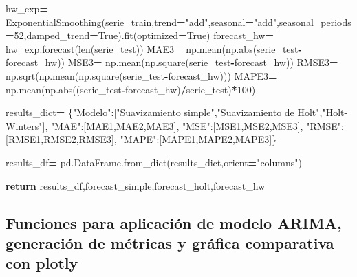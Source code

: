 \documentclass[
]{book}
\newenvironment{Shaded}{\begin{snugshade}}{\end{snugshade}}
\newcommand{\BuiltInTok}[1]{#1}
\newcommand{\ControlFlowTok}[1]{\textcolor[rgb]{0.13,0.29,0.53}{\textbf{#1}}}
\newcommand{\DecValTok}[1]{\textcolor[rgb]{0.00,0.00,0.81}{#1}}
\newcommand{\NormalTok}[1]{#1}
\newcommand{\OperatorTok}[1]{\textcolor[rgb]{0.81,0.36,0.00}{\textbf{#1}}}
\newcommand{\StringTok}[1]{\textcolor[rgb]{0.31,0.60,0.02}{#1}}
\newcommand{\VariableTok}[1]{\textcolor[rgb]{0.00,0.00,0.00}{#1}}
\begin{document}
\begin{Shaded}
\begin{Highlighting}[]
\NormalTok{    hw\_exp}\OperatorTok{=}\NormalTok{ ExponentialSmoothing(serie\_train,trend}\OperatorTok{=}\StringTok{"add"}\NormalTok{,seasonal}\OperatorTok{=}\StringTok{"add"}\NormalTok{,seasonal\_periods}\OperatorTok{=}\DecValTok{52}\NormalTok{,damped\_trend}\OperatorTok{=}\VariableTok{True}\NormalTok{).fit(optimized}\OperatorTok{=}\VariableTok{True}\NormalTok{)}
\NormalTok{    forecast\_hw}\OperatorTok{=}\NormalTok{ hw\_exp.forecast(}\BuiltInTok{len}\NormalTok{(serie\_test))}
\NormalTok{    MAE3}\OperatorTok{=}\NormalTok{ np.mean(np.}\BuiltInTok{abs}\NormalTok{(serie\_test}\OperatorTok{{-}}\NormalTok{forecast\_hw))}
\NormalTok{    MSE3}\OperatorTok{=}\NormalTok{ np.mean(np.square(serie\_test}\OperatorTok{{-}}\NormalTok{forecast\_hw))}
\NormalTok{    RMSE3}\OperatorTok{=}\NormalTok{ np.sqrt(np.mean(np.square(serie\_test}\OperatorTok{{-}}\NormalTok{forecast\_hw)))}
\NormalTok{    MAPE3}\OperatorTok{=}\NormalTok{ np.mean(np.}\BuiltInTok{abs}\NormalTok{((serie\_test}\OperatorTok{{-}}\NormalTok{forecast\_hw)}\OperatorTok{/}\NormalTok{serie\_test)}\OperatorTok{*}\DecValTok{100}\NormalTok{)}
  
\NormalTok{    results\_dict}\OperatorTok{=}\NormalTok{ \{}\StringTok{"Modelo"}\NormalTok{:[}\StringTok{"Suavizamiento simple"}\NormalTok{,}\StringTok{"Suavizamiento de Holt"}\NormalTok{,}\StringTok{"Holt{-}Winters"}\NormalTok{],}
                 \StringTok{"MAE"}\NormalTok{:[MAE1,MAE2,MAE3],}
                 \StringTok{"MSE"}\NormalTok{:[MSE1,MSE2,MSE3],}
                 \StringTok{"RMSE"}\NormalTok{:[RMSE1,RMSE2,RMSE3],}
                 \StringTok{"MAPE"}\NormalTok{:[MAPE1,MAPE2,MAPE3]\} }
                 
\NormalTok{    results\_df}\OperatorTok{=}\NormalTok{ pd.DataFrame.from\_dict(results\_dict,orient}\OperatorTok{=}\StringTok{"columns"}\NormalTok{)}
  
    \ControlFlowTok{return}\NormalTok{ results\_df,forecast\_simple,forecast\_holt,forecast\_hw}
\end{Highlighting}
\end{Shaded}

\hypertarget{funciones-para-aplicaciuxf3n-de-modelo-arima-generaciuxf3n-de-muxe9tricas-y-gruxe1fica-comparativa-con-plotly}{%
\subsection{Funciones para aplicación de modelo ARIMA, generación de métricas y gráfica comparativa con plotly}\label{funciones-para-aplicaciuxf3n-de-modelo-arima-generaciuxf3n-de-muxe9tricas-y-gruxe1fica-comparativa-con-plotly}}
\end{document}
